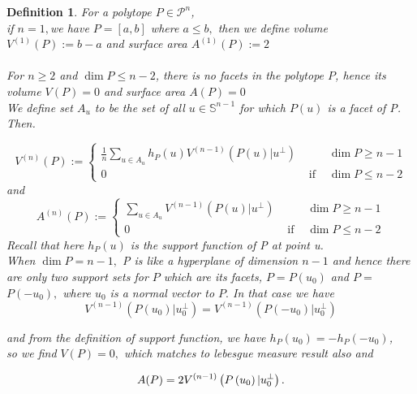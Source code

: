 \documentclass[oneside]{book}
\newtheorem{mydef}{Definition}[section]
\begin{document}
	\begin{mydef} \label{14}
		For a polytope $P \in \mathcal{P}^{n}$,\\
		if  $n=1,$we have  $P=[a, b]$ where $a \leq b,$ then we define volume $V^{(1)}(P):=b-a$ and  surface area $A^{(1)}(P):=2$ 
		\\\\
		For  $ n \geq 2  $ and $\operatorname{dim} P \leq n-2$, there is no facets in the polytope $P$, hence its volume $V(P)=0$ and surface area $A(P)=0$ \\
		
		We define set $A_{{u}}$ to be the set of all $u \in \mathbb{S}^{n-1}$ for which $P(u)$ is a facet of P. Then. 
		
		\begin{equation}
			\label{eq43}
			V^{(n)}(P):=\left\{\begin{array}{ccc}
				\frac{1}{n}  \sum_{u \in A_{u}} h_{P}(u) V^{(n-1)}\left(P(u) | u^{\perp}\right) & & \operatorname{dim} P \geq n-1 \\
				0 & \text { if } & \operatorname{dim} P \leq n-2
			\end{array} 
			\right.
		\end{equation}
		and
		\begin{equation}
			\label{eq44}
			A^{(n)}(P):=\left\{\begin{array}{ccc}
				\sum_{u \in A_{u}} V^{(n-1)}\left(P(u) | u^{\perp}\right) & & \operatorname{dim} P \geq n-1 \\
				0 & \text { if } & \operatorname{dim} P \leq n-2
			\end{array}\right.
		\end{equation}
		Recall that here $h_{P}(u)$ is the support function of P at point u. \\
		When $\operatorname{dim} P=n-1, $ P is like a hyperplane of dimension $n - 1$  and hence there are only two support sets for $P$ which are its facets, $P=P\left(u_{0}\right)$ and $P=$ $P\left(-u_{0}\right),$ where $u_{0}$ is a normal vector to $P .$ In that case we have $$V^{(n-1)}\left(P\left(u_{0}\right) | u_{0}^{\perp}\right)=V^{(n-1)}\left(P\left(-u_{0}\right) | u_{0}^{\perp}\right)$$
		
		and from the  definition of support function, we have $h_{P}\left(u_{0}\right)=-h_{P}\left(-u_{0}\right)$,\\ so we find $V(P)=0,$ which matches to lebesgue measure result also  and 
		
		\begin{equation}
			\label{eq45}
			A(P)=2 V^{(n-1)}\left(P\left(u_{0}\right) | u_{0}^{\perp}\right).\\\\
		\end{equation}
	\end{mydef} 
\end{document}
